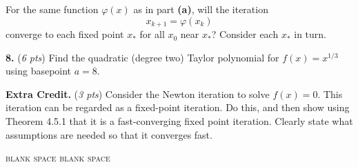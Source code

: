 \documentclass[11pt]{amsart}
\newcommand{\prob}[1]{\bigskip\noindent\textbf{#1.} }
\newcommand{\pts}[1]{(\emph{#1 pts})}
\newcommand{\probpts}[2]{\prob{#1} \pts{#2} \quad}
\begin{document}
\medskip
\noindent For the same function $\varphi(x)$ as in part \textbf{(a)}, will the iteration
	$$x_{k+1} = \varphi(x_k)$$
converge to each fixed point $x_\ast$ for all $x_0$ near $x_\ast$?  Consider each $x_\ast$ in turn.
\vfill


\newpage
\probpts{8}{6} Find the quadratic (degree two) Taylor polynomial for $f(x)=x^{1/3}$ using basepoint $a=8$.
\vfill


\probpts{Extra Credit}{3}  Consider the Newton iteration to solve $f(x)=0$.  This iteration can be regarded as a fixed-point iteration.  Do this, and then show using Theorem 4.5.1 that it is a fast-converging fixed point iteration.  Clearly state what assumptions are needed so that it converges fast.
\vfill

\newpage

\tiny
\noindent \textsc{blank space} \hfill \textsc{blank space}
\vfill
\end{document}
